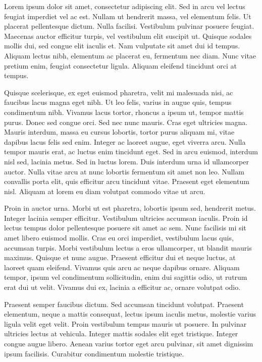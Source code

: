 Lorem ipsum dolor sit amet, consectetur adipiscing elit. Sed in arcu vel lectus feugiat imperdiet vel ac est. Nullam ut hendrerit massa, vel elementum felis. Ut placerat pellentesque dictum. Nulla facilisi. Vestibulum pulvinar posuere feugiat. Maecenas auctor efficitur turpis, vel vestibulum elit suscipit ut. Quisque sodales mollis dui, sed congue elit iaculis et. Nam vulputate sit amet dui id tempus. Aliquam lectus nibh, elementum ac placerat eu, fermentum nec diam. Nunc vitae pretium enim, feugiat consectetur ligula. Aliquam eleifend tincidunt orci at tempus.

Quisque scelerisque, ex eget euismod pharetra, velit mi malesuada nisi, ac faucibus lacus magna eget nibh. Ut leo felis, varius in augue quis, tempus condimentum nibh. Vivamus lacus tortor, rhoncus a ipsum ut, tempor mattis purus. Donec sed congue orci. Sed nec nunc mauris. Cras eget ultricies magna. Mauris interdum, massa eu cursus lobortis, tortor purus aliquam mi, vitae dapibus lacus felis sed enim. Integer ac laoreet augue, eget viverra arcu. Nulla tempor mauris erat, ac luctus enim tincidunt eget. Sed in arcu euismod, interdum nisl sed, lacinia metus. Sed in luctus lorem. Duis interdum urna id ullamcorper auctor. Nulla vitae arcu at nunc lobortis fermentum sit amet non leo. Nullam convallis porta elit, quis efficitur arcu tincidunt vitae. Praesent eget elementum nisl. Aliquam at lorem eu diam volutpat commodo vitae ut arcu.

Proin in auctor urna. Morbi ut est pharetra, lobortis ipsum sed, hendrerit metus. Integer lacinia semper efficitur. Vestibulum ultricies accumsan iaculis. Proin id lectus tempus dolor pellentesque posuere sit amet ac sem. Nunc facilisis mi sit amet libero euismod mollis. Cras eu orci imperdiet, vestibulum lacus quis, accumsan turpis. Morbi vestibulum lectus a eros ullamcorper, ut blandit mauris maximus. Quisque et nunc augue. Praesent efficitur dui et neque luctus, at laoreet quam eleifend. Vivamus quis arcu ac neque dapibus ornare. Aliquam tempor, ipsum vel condimentum sollicitudin, enim dui sagittis odio, ut rutrum erat dui ut velit. Vivamus dui ex, lacinia a efficitur ac, ornare volutpat odio.

Praesent semper faucibus dictum. Sed accumsan tincidunt volutpat. Praesent elementum, neque a mattis consequat, lectus ipsum iaculis metus, molestie varius ligula velit eget velit. Proin vestibulum tempus mauris ut posuere. In pulvinar ultricies lectus at vehicula. Integer mattis sodales elit eget tristique. Integer congue augue libero. Aenean varius tortor eget arcu pulvinar, sit amet dignissim ipsum facilisis. Curabitur condimentum molestie tristique.

